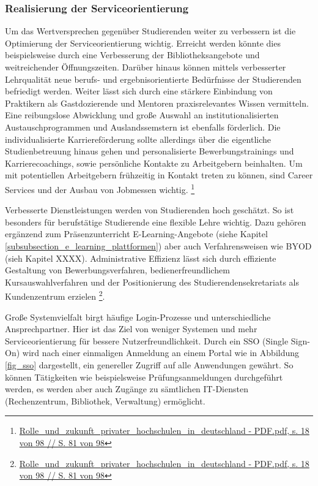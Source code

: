 \subsubsection{Realisierung der Serviceorientierung}
Um das Wertversprechen gegenüber Studierenden weiter zu verbessern ist die Optimierung der Serviceorientierung wichtig. Erreicht werden könnte dies beispielsweise durch eine Verbesserung der Bibliotheksangebote und weitreichender Öffnungszeiten. Darüber hinaus können mittels verbesserter Lehrqualität neue berufs- und ergebnisorientierte Bedürfnisse der Studierenden befriedigt werden. Weiter lässt sich durch eine stärkere Einbindung von Praktikern als Gastdozierende und Mentoren praxisrelevantes Wissen vermitteln. Eine reibungslose Abwicklung und große Auswahl an institutionalisierten Austauschprogrammen und Auslandssemstern ist ebenfalls förderlich. Die individualisierte Karriereförderung sollte allerdings über die eigentliche Studienbetreuung hinaus gehen und personalisierte Bewerbungstrainings und Karrierecoachings, sowie persönliche Kontakte zu Arbeitgebern beinhalten. Um mit potentiellen Arbeitgebern frühzeitig in Kontakt treten zu können, sind Career Services und der Ausbau von Jobmessen wichtig. \footnote{\url{Rolle_und_zukunft_privater_hochschulen_in_deutschland - PDF.pdf, s. 18 von 98 // S. 81 von 98}}

Verbesserte Dienstleistungen werden von Studierenden hoch geschätzt. So ist besonders für berufstätige Studierende eine flexible Lehre wichtig. Dazu gehören ergänzend zum Präsenzunterricht E-Learning-Angebote (siehe Kapitel \ref{subsubsection_e_learning_plattformen}) aber auch Verfahrensweisen wie BYOD (sieh Kapitel XXXX). Administrative Effizienz lässt sich durch effiziente Gestaltung von Bewerbungsverfahren, bedienerfreundlichem Kursauswahlverfahren und der Positionierung des Studierendensekretariats als Kundenzentrum erzielen \footnote{\url{Rolle_und_zukunft_privater_hochschulen_in_deutschland - PDF.pdf, s. 18 von 98 // S. 81 von 98}}.

Große Systemvielfalt birgt häufige Login-Prozesse und unterschiedliche Ansprechpartner. Hier ist das Ziel von weniger Systemen und mehr Serviceorientierung für bessere Nutzerfreundlichkeit. Durch ein SSO (Single Sign-On) wird nach einer einmaligen Anmeldung an einem Portal wie in Abbildung \ref{fig_sso} dargestellt, ein genereller Zugriff auf alle Anwendungen gewährt. So können Tätigkeiten wie beispielsweise Prüfungsanmeldungen durchgeführt werden, es werden aber auch Zugänge zu sämtlichen IT-Diensten (Rechenzentrum, Bibliothek, Verwaltung) ermöglicht.

